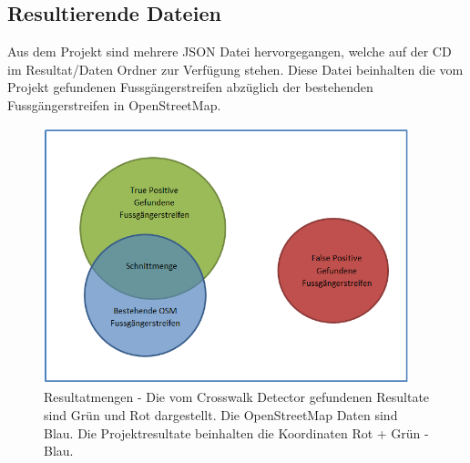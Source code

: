 \subsection{Resultierende Dateien}
Aus dem Projekt sind mehrere JSON Datei hervorgegangen, welche  auf der CD im Resultat/Daten Ordner zur Verfügung stehen. Diese Datei beinhalten die vom Projekt gefundenen Fussgängerstreifen abzüglich der bestehenden Fussgängerstreifen in OpenStreetMap. 
\begin{figure}[H]
	\centering
	\includegraphics[width=300pt]{images/Resultatmenge.png}
	\caption[Resultatmengen]{Resultatmengen - Die vom Crosswalk Detector gefundenen Resultate sind Grün und Rot dargestellt. Die OpenStreetMap Daten sind Blau. Die Projektresultate beinhalten die Koordinaten Rot + Grün - Blau.}
\end{figure}

\newpage

